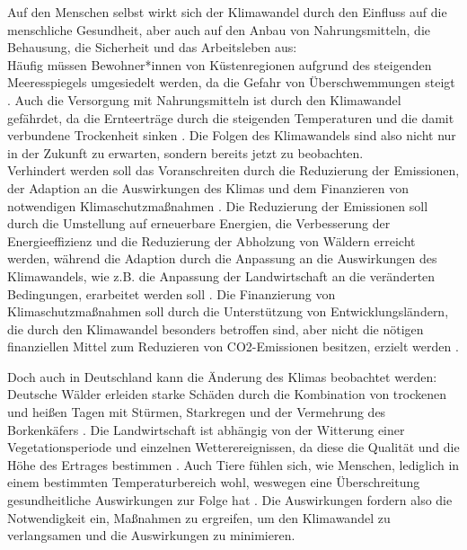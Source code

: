 Auf den Menschen selbst wirkt sich der Klimawandel durch den Einfluss auf die menschliche Gesundheit, aber auch auf den Anbau von Nahrungsmitteln, die Behausung, die Sicherheit und das Arbeitsleben aus: \\ Häufig müssen Bewohner*innen von Küstenregionen aufgrund des steigenden Meeresspiegels umgesiedelt werden, da die Gefahr von Überschwemmungen steigt \cite{UnitedNationsClimateChange}. Auch die Versorgung mit Nahrungsmitteln ist durch den Klimawandel gefährdet, da die Ernteerträge durch die steigenden Temperaturen und die damit verbundene Trockenheit sinken \cite{UnitedNationsClimateChange}. Die Folgen des Klimawandels sind also nicht nur in der Zukunft zu erwarten, sondern bereits jetzt zu beobachten. \\ Verhindert werden soll das Voranschreiten durch die Reduzierung der Emissionen, der Adaption an die Auswirkungen des Klimas und dem Finanzieren von notwendigen Klimaschutzmaßnahmen \cite{UnitedNationsClimateChange}. Die Reduzierung der Emissionen soll durch die Umstellung auf erneuerbare Energien, die Verbesserung der Energieeffizienz und die Reduzierung der Abholzung von Wäldern erreicht werden, während die Adaption durch die Anpassung an die Auswirkungen des Klimawandels, wie z.B. die Anpassung der Landwirtschaft an die veränderten Bedingungen, erarbeitet werden soll \cite{UnitedNationsClimateChange}. Die Finanzierung von Klimaschutzmaßnahmen soll durch die Unterstützung von Entwicklungsländern, die durch den Klimawandel besonders betroffen sind, aber nicht die nötigen finanziellen Mittel zum Reduzieren von CO2-Emissionen besitzen, erzielt werden \cite{UnitedNationsClimateChange}.


Doch auch in Deutschland kann die Änderung des Klimas beobachtet werden: Deutsche Wälder erleiden starke Schäden durch die Kombination von trockenen und heißen Tagen mit Stürmen, Starkregen und der Vermehrung des Borkenkäfers \cite{UmweltbundesamtRisikoanalyse2021}. Die Landwirtschaft ist abhängig von der Witterung einer Vegetationsperiode und einzelnen Wetterereignissen, da diese die Qualität und die Höhe des Ertrages bestimmen \cite{UmweltbundesamtRisikoanalyse2021}. Auch Tiere fühlen sich, wie Menschen, lediglich in einem bestimmten Temperaturbereich wohl, weswegen eine Überschreitung gesundheitliche Auswirkungen zur Folge hat \cite{UmweltbundesamtRisikoanalyse2021}. Die Auswirkungen fordern also die Notwendigkeit ein, Maßnahmen zu ergreifen, um den Klimawandel zu verlangsamen und die Auswirkungen zu minimieren.

